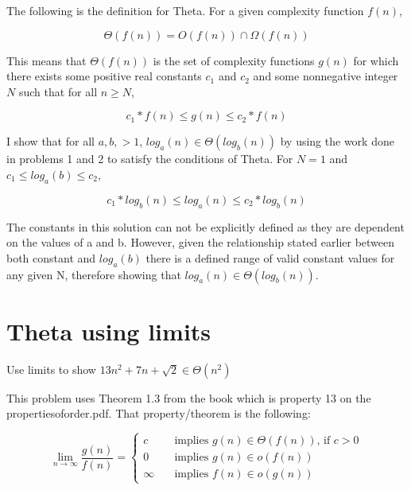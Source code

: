 \documentclass[11pt]{article}
\begin{document}
\bigskip
\bigskip
The following is the definition for Theta. For a given complexity function $f(n)$,

\begin{equation*}
\Theta(f(n))= O(f(n))\cap \Omega(f(n))
\end{equation*}

This means that $\Theta(f(n))$ is the set of complexity functions $g(n)$ for which there exists some positive real constants $c_1$ and $c_2$ and some nonnegative integer $N$ such that for all $n \geq N$,

\begin{equation*}
c_1*f(n) \leq g(n) \leq c_2*f(n)
\end{equation*}

\bigskip
I show that for all $a,b, >1$,  $log_a(n) \in \Theta(log_b(n))$ by using the work done in problems 1 and 2 to satisfy the conditions of Theta. For $N=1$ and $c_1 \leq log_a(b) \leq c_2$,

\begin{equation*}
c_1*log_b(n) \leq log_a(n) \leq c_2*log_b(n)
\end{equation*}

The constants in this solution can not be explicitly defined as they are dependent on the values of a and b. However, given the relationship stated earlier between both constant and $log_a(b)$ there is a defined range of valid constant values for any given N, therefore showing that $log_a(n) \in \Theta(log_b(n))$.

\section{Theta using limits}
Use limits to show $13n^2+7n+\sqrt2 \in \Theta(n^2)$


\bigskip
\bigskip

This problem uses Theorem 1.3 from the book which is property 13 on the propertiesoforder.pdf. That property/theorem is the following:

\[ \lim\limits_{n \to \infty} \frac{g(n)}{f(n)} =
  \begin{cases}
    c       & \quad \text{implies }  g(n) \text{$\in \Theta (f(n))$, if $c>0$}\\
    0       & \quad \text{implies } g(n) \text{$\in o(f(n))$}\\
    \infty  & \quad \text{implies } f(n) \text{$\in o(g(n))$}
  \end{cases}
\]
\end{document}
